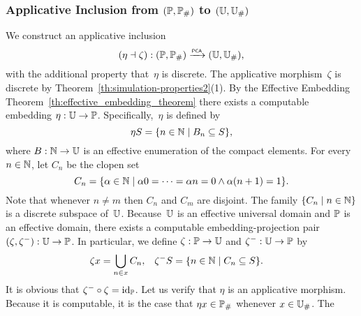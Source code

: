
\subsubsection{Applicative Inclusion from $(\Scott, \comp{\Scott})$ to $(\UU,
  \comp{\UU})$}
\label{sec:app_mor_PP_UU}%

%
%

We construct an applicative inclusion
\begin{equation*}
  (\eta \dashv \zeta): (\Scott, \comp{\Scott}) \pcato (\UU, \comp{\UU}),
\end{equation*}
with the additional property that~$\eta$ is discrete. The applicative
morphism~$\zeta$ is discrete by
Theorem~\ref{th:simulation-properties2}(1). By the Effective
Embedding Theorem~\ref{th:effective_embedding_theorem} there exists a
computable embedding $\eta: \UU \to \Scott$. Specifically,~$\eta$ is
defined by
%
\begin{equation*}
  \eta S = \set{ n \in \NN \such B_n \subseteq S },
\end{equation*}
%
where $B : \NN \to \UU$ is an effective enumeration of the compact elements. For every $n \in \NN$, let $C_n$ be the clopen set
%
\begin{equation*}
  C_n = \set{ \alpha \in \NN \such
    \alpha 0 = \cdots = \alpha n = 0 \land \alpha (n+1) = 1
    }.
\end{equation*}
%
Note that whenever $n \neq m$ then $C_n$ and $C_m$ are disjoint. The
family $\set{C_n \such n \in \NN}$ is a discrete subspace of~$\UU$.
Because~$\UU$ is an effective universal domain and $\Scott$ is an
effective domain, there exists a computable embedding-projection pair
$(\zeta, \zeta^{-}): \UU \to \Scott$. In particular, we define
$\zeta: \Scott \to \UU$ and $\zeta^{-}: \UU \to \Scott$ by
%
\begin{align*}
  \zeta x &= \bigcup_{n \in x} C_n,
  &
  \zeta^{-} S &= \set{n \in \NN \such C_n \subseteq S}.
\end{align*}
%
It is obvious that $\zeta^{-} \circ \zeta = \id[\Scott]$. Let us verify
that $\eta$ is an applicative morphism. Because it is computable, it
is the case that $\eta x \in \comp{\Scott}$ whenever $x \in \comp{\UU}$. The
